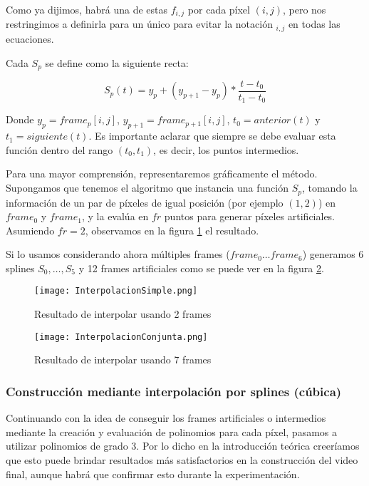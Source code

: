 Como ya dijimos, habrá una de estas $f_{i,j}$ por cada píxel $(i,j)$, pero nos restringimos a definirla para un único para evitar la notación $_{i,j}$ en todas las ecuaciones.

Cada $S_p$ se define como la siguiente recta:

$$S_p(t) = y_p + (y_{p+1} - y_p) * \frac{t - t_0}{t_1 - t_0}$$

Donde $y_{p} = frame_p[i,j]$, $y_{p+1} = frame_{p+1}[i,j]$, $t_0=anterior(t)$ y $t_1=siguiente(t)$. Es importante aclarar que siempre se debe evaluar esta funci\'on dentro del rango $(t_0, t_1)$, es decir, los puntos intermedios.

Para una mayor comprensi\'on, representaremos gr\'aficamente el método. Supongamos que tenemos el algoritmo que instancia una funci\'on $S_{p}$, tomando la información de un par de p\'ixeles de igual posici\'on (por ejemplo $(1,2)$) en $frame_0$ y $frame_1$, y la evalúa en $fr$ puntos para generar píxeles artificiales. Asumiendo $fr = 2$, observamos en la figura \ref{fig:intSimple} el resultado.

Si lo usamos considerando ahora múltiples frames ($frame_0 \ldots frame_6$) generamos 6 splines $S_0, \ldots, S_5$ y 12 frames artificiales como se puede ver en la figura \ref{fig:intConjunta}.

\begin{figure}[h!]
  \centering
    \texttt{[image: InterpolacionSimple.png]}
     \caption{Resultado de interpolar usando 2 frames}\label{fig:intSimple}
\end{figure}
\noindent

\begin{figure}[h!]
  \centering
    \texttt{[image: InterpolacionConjunta.png]}
     \caption{Resultado de interpolar usando 7 frames}\label{fig:intConjunta}
\end{figure}
\noindent

\subsubsection{Construcción mediante interpolación por splines (c\'ubica)}

Continuando con la idea de conseguir los frames artificiales o intermedios mediante la creación y evaluación de polinomios para cada píxel, pasamos a utilizar polinomios de grado 3. Por lo dicho en la introducción teórica creeríamos que esto puede brindar resultados m\'as satisfactorios en la construcci\'on del video final, aunque habr\'a que confirmar esto durante la experimentaci\'on.

